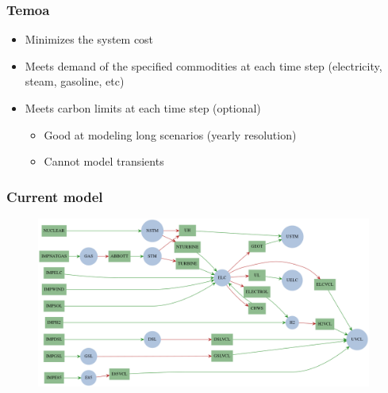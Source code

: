
\begin{frame}
\frametitle{Temoa}
	\begin{itemize}
		\item Minimizes the system cost
		\item Meets demand of the specified commodities at each time step (electricity, steam, gasoline, etc)
		\item Meets carbon limits at each time step (optional)
		\begin{itemize}
			\item Good at modeling long scenarios (yearly resolution)
			\item Cannot model transients
		\end{itemize}
	\end{itemize}
\end{frame}


\begin{frame}
\frametitle{Current model}

	\begin{figure}[htbp!]
		\begin{center}
			\includegraphics[height=5.6cm]{images/scenario11.png}
		\end{center}
	\end{figure}

\end{frame}


